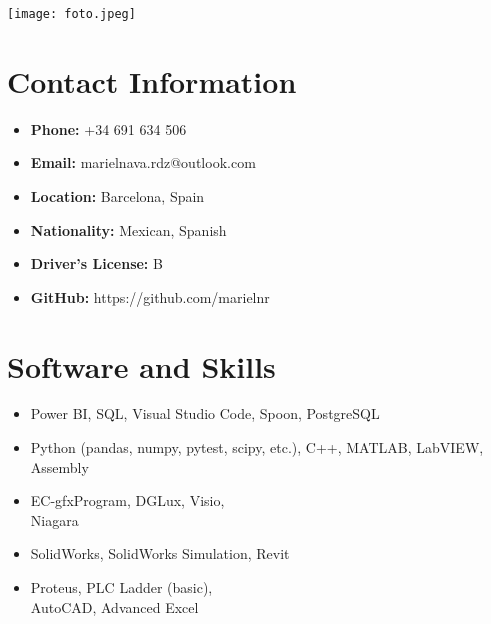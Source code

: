 \documentclass[11pt,a4paper]{article}
\begin{document}
\begin{minipage}[t]{.3\textwidth}
\justifying

\texttt{[image: foto.jpeg]} \\
\vspace{1.5em} %

\colorbox{verylightgray}{\parbox{\dimexpr\textwidth-2\fboxsep\relax}{\justifying
\vspace{.6em} %

\section*{Contact Information}
\footnotesize
\begin{itemize}
    \item \textbf{Phone:} +34 691 634 506
    \item \textbf{Email:} marielnava.rdz@outlook.com
    \item \textbf{Location:} Barcelona, Spain
    \item \textbf{Nationality:} Mexican, Spanish
    \item \textbf{Driver's License:} B
    \item \textbf{GitHub:} https://github.com/marielnr
\end{itemize}
\vspace{1em}

\section*{Software and Skills}
\footnotesize
\begin{itemize}
    \item Power BI, SQL, Visual Studio Code, Spoon, PostgreSQL
    \item Python (pandas, numpy, pytest, scipy, etc.), C++, MATLAB, LabVIEW,\\Assembly
    \item EC-gfxProgram, DGLux, Visio, \\Niagara
    \item SolidWorks, SolidWorks Simulation, Revit
    \item Proteus, PLC Ladder (basic), \\AutoCAD, Advanced Excel
\end{itemize}
\vspace{1em}

}}
\end{minipage}
\end{document}
